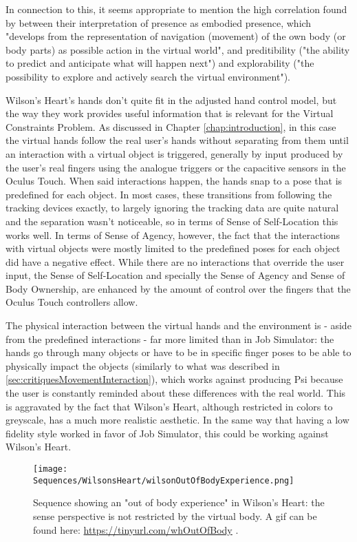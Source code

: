 In connection to this, it seems appropriate to mention the high correlation found by \parencite{Schubert1999} between their interpretation of presence as embodied presence, which "develops from the representation of navigation (movement) of the own body (or body parts) as possible action in the virtual world", and preditibility ("the ability to predict and anticipate what will happen next") and explorability ("the possibility to explore and actively search the virtual environment").

Wilson's Heart's hands don't quite fit in the adjusted hand control model, but the way they work provides useful information that is relevant for the Virtual Constraints Problem. As discussed in Chapter \ref{chap:introduction}, in this case the virtual hands follow the real user's hands without separating from them until an interaction with a virtual object is triggered, generally by input produced by the user's real fingers using the analogue triggers or the capacitive sensors in the Oculus Touch. When said interactions happen, the hands snap to a pose that is predefined for each object. In most cases, these transitions from following the tracking devices exactly, to largely ignoring the tracking data are quite natural and the separation wasn't noticeable, so in terms of Sense of Self-Location this works well. In terms of Sense of Agency, however, the fact that the interactions with virtual objects were mostly limited to the predefined poses for each object did have a negative effect. While there are no interactions that override the user input, the Sense of Self-Location and specially the Sense of Agency and Sense of Body Ownership, are enhanced by the amount of control over the fingers that the Oculus Touch controllers allow.

The physical interaction between the virtual hands and the environment is - aside from the predefined interactions - far more limited than in Job Simulator: the hands go through many objects or have to be in specific finger poses to be able to physically impact the objects (similarly to what was described in \ref{sec:critiquesMovementInteraction}), which works against producing Psi because the user is constantly reminded about these differences with the real world. This is aggravated by the fact that Wilson's Heart, although restricted in colors to greyscale, has a much more realistic aesthetic. In the same way that having a low fidelity style worked in favor of Job Simulator, this could be working against Wilson's Heart.

\begin{figure}[h]
\centering
\texttt{[image: Sequences/WilsonsHeart/wilsonOutOfBodyExperience.png]}
\caption{Sequence showing an "out of body experience" in Wilson's Heart: the sense perspective is not restricted by the virtual body. A gif can be found here: \url{https://tinyurl.com/whOutOfBody} .}
\label{fig:wilsonOutOfBody}
\end{figure}

